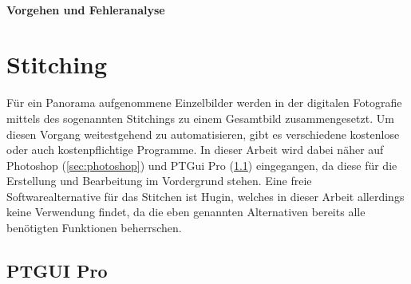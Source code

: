 \documentclass[liststotoc,bibtotoc,fontsize=14pt,]{scrreprt}
\begin{document}
			\subsubsection{Vorgehen und Fehleranalyse}
			
			
	\chapter{Stitching}
	\label{ch:stitiching}
	Für ein Panorama aufgenommene Einzelbilder werden in der digitalen Fotografie mittels des sogenannten Stitchings zu einem Gesamtbild zusammengesetzt. Um diesen Vorgang weitestgehend zu automatisieren, gibt es verschiedene kostenlose oder auch kostenpflichtige Programme. In dieser Arbeit wird dabei näher auf Photoshop (\ref{sec:photoshop}) und PTGui Pro (\ref{sec:ptgui}) eingegangen, da diese für die Erstellung und Bearbeitung im Vordergrund stehen. Eine freie Softwarealternative für das Stitchen ist Hugin, welches in dieser Arbeit allerdings keine Verwendung findet, da die eben genannten Alternativen bereits alle benötigten Funktionen beherrschen.
	
	\section{PTGUI Pro}
	\label{sec:ptgui}
	
\end{document}
